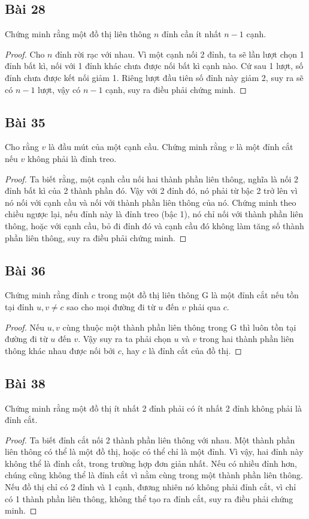 \subsection*{Bài 28}
Chứng minh rằng một đồ thị liên thông $n$ đỉnh cần ít nhất $n-1$ cạnh.
\begin{proof}
Cho $n$ đỉnh rời rạc với nhau. Vì một cạnh nối 2 đỉnh, ta sẽ lần lượt chọn 1 đỉnh bất kì, nối với 1 đỉnh khác chưa được nối bất kì cạnh nào. Cứ sau 1 lượt, số đỉnh chưa được kết nối giảm 1. Riêng lượt đầu tiên số đỉnh này giảm 2, suy ra sẽ có $n-1$ lượt, vậy có $n-1$ cạnh, suy ra điều phải chứng minh.
\end{proof}
\subsection*{Bài 35}
Cho rằng $v$ là đầu mút của một cạnh cầu. Chứng minh rằng $v$ là một đỉnh cắt nếu $v$ không phải là đỉnh treo.
\begin{proof}
Ta biết rằng, một cạnh cầu nối hai thành phần liên thông, nghĩa là nối 2 đỉnh bất kì của 2 thành phần đó. Vậy với 2 đỉnh đó, nó phải từ bậc 2 trở lên vì nó nối với cạnh cầu và nối với thành phần liên thông của nó. Chứng minh theo chiều ngược lại, nếu đỉnh này là đỉnh treo (bậc 1), nó chỉ nối với thành phần liên thông, hoặc với cạnh cầu, bỏ đi đỉnh đó và cạnh cầu đó không làm tăng số thành phần liên thông, suy ra điều phải chứng minh.
\end{proof}
\subsection*{Bài 36}
Chứng minh rằng đỉnh $c$ trong một đồ thị liên thông G là một đỉnh cắt nếu tồn tại đỉnh $u,v\neq c$ sao cho mọi đường đi từ $u$ đến $v$ phải qua $c$.
\begin{proof}
Nếu $u,v$ cùng thuộc một thành phần liên thông trong G thì luôn tồn tại đường đi từ $u$ đến $v$. Vậy suy ra ta phải chọn $u$ và $v$ trong hai thành phần liên thông khác nhau được nối bởi $c$, hay $c$ là đỉnh cắt của đồ thị.
\end{proof}
\subsection*{Bài 38}
Chứng minh rằng một đồ thị ít nhất 2 đỉnh phải có ít nhất 2 đỉnh không phải là đỉnh cắt.
\begin{proof}
Ta biết đỉnh cắt nối 2 thành phần liên thông với nhau. Một thành phần liên thông có thể là một đồ thị, hoặc có thể chỉ là một đỉnh. Vì vậy, hai đỉnh này không thể là đỉnh cắt, trong trường hợp đơn giản nhất. Nếu có nhiều đỉnh hơn, chúng cũng không thể là đỉnh cắt vì nằm cùng trong một thành phần liên thông. Nếu đồ thị chỉ có 2 đỉnh và 1 cạnh, đương nhiên nó không phải đỉnh cắt, vì chỉ có 1 thành phần liên thông, không thể tạo ra đỉnh cắt, suy ra điều phải chứng minh.
\end{proof}